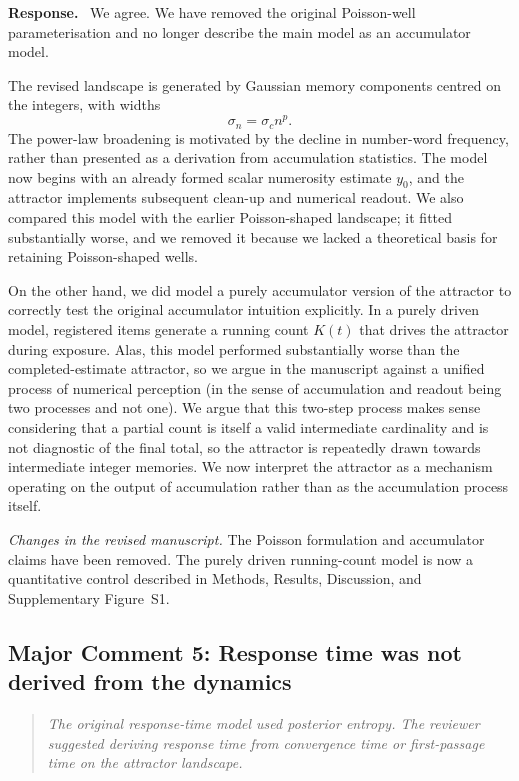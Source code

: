 \documentclass[11pt]{article}
\newenvironment{reviewercomment}{\begin{quote}\color{reviewgray}\itshape}{\end{quote}}
\newenvironment{authorresponse}{\par\noindent\textbf{\color{responseblue}Response.}\ }{\par}
\newcommand{\change}[1]{\par\noindent\textit{Changes in the revised manuscript.} #1\par}
\begin{document}
\begin{authorresponse}
We agree. We have removed the original Poisson-well parameterisation and no longer describe the main model as an accumulator model.

The revised landscape is generated by Gaussian memory components centred on the integers, with widths
\[
\sigma_n=\sigma_c n^p.
\]
The power-law broadening is motivated by the decline in number-word frequency, rather than presented as a derivation from accumulation statistics. The model now begins with an already formed scalar numerosity estimate $y_0$, and the attractor implements subsequent clean-up and numerical readout. We also compared this model with the earlier Poisson-shaped landscape; it fitted substantially worse, and we removed it because we lacked a theoretical basis for retaining Poisson-shaped wells.

On the other hand, we did model a purely accumulator version of the attractor to correctly test the original accumulator intuition explicitly. In a purely driven model, registered items generate a running count $K(t)$ that drives the attractor during exposure. Alas, this model performed substantially worse than the completed-estimate attractor, so we argue in the manuscript against a unified process of numerical perception (in the sense of accumulation and readout being two processes and not one). We argue that this two-step process makes sense considering that a partial count is itself a valid intermediate cardinality and is not diagnostic of the final total, so the attractor is repeatedly drawn towards intermediate integer memories. We now interpret the attractor as a mechanism operating on the output of accumulation rather than as the accumulation process itself.

\end{authorresponse}

\change{The Poisson formulation and accumulator claims have been removed. The purely driven running-count model is now a quantitative control described in Methods, Results, Discussion, and Supplementary Figure~S1.}

\subsection*{Major Comment 5: Response time was not derived from the dynamics}

\begin{reviewercomment}
The original response-time model used posterior entropy. The reviewer suggested deriving response time from convergence time or first-passage time on the attractor landscape.
\end{reviewercomment}
\end{document}

